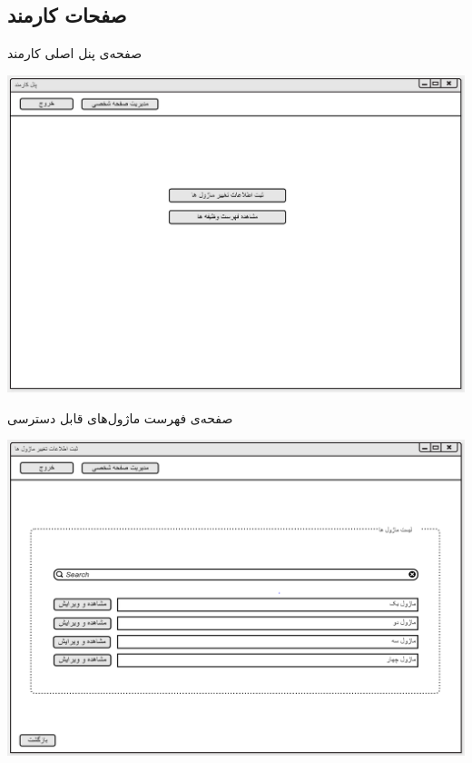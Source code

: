 \newpage
\subsection{صفحات کارمند}

\vspace{1cm}
صفحه‌ی پنل اصلی کارمند
\begin{center}
\includegraphics[width=\textwidth]{Prototype/Employee/EmployeePanel.png}
\end{center}

\newpage
\vspace{1cm}
صفحه‌ی فهرست ماژول‌های قابل دسترسی
\begin{center}
\includegraphics[width=\textwidth]{Prototype/Employee/ChangeModuleInformation.png}
\end{center}

